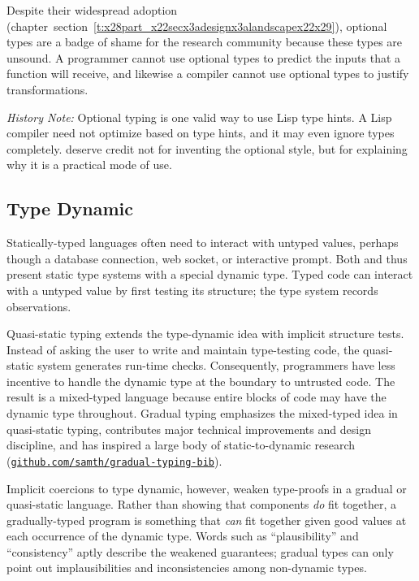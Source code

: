 \documentclass[ twoside,open=right,titlepage,numbers=noenddot,headinclude,%
                footinclude=true,cleardoublepage=empty,abstract=off,
                BCOR=5mm,paper=a4,fontsize=11pt,%
                ngerman,american,%
                parts,pdfspacing]{scrreprt}
\newcommand{\SecRef}[2]{section~#1}
\newcommand{\SecRefLocal}[3]{\hyperref[#1]{\SecRef{#2}{#3}}}
\newcommand{\Ssubsubsection}[2]{\subsubsection[#1]{#2}}
\newcommand{\Snolinkurl}[1]{\nolinkurl{#1}}
\renewcommand{\Ssubsubsection}[2]{\subsection[#1]{#2}}
\renewcommand{\SecRefLocal}[3]{section~\ref{#1}}
\begin{document}
Despite their widespread adoption (chapter~\SecRefLocal{t:x28part_x22secx3adesignx3alandscapex22x29}{4.2}{Assorted Behaviors by Example}),
 optional types are a badge of shame for the research community because
 these types are unsound.
A programmer cannot use optional types to predict the inputs that a function
 will receive, and likewise a compiler cannot use optional types to justify
 transformations.

\emph{History Note:}
Optional typing is one valid way to use Lisp type hints.
A Lisp compiler need not optimize based on type hints, and it may even ignore
 types completely.
 deserve credit not for inventing the optional style,
 but for explaining why it is a practical mode of use.

\Ssubsubsection{Type Dynamic}{Type Dynamic}\label{t:x28part_x22Typex5fDynamicx22x29}

Statically{-}typed languages often need to interact with untyped values,
 perhaps though a database connection, web socket, or interactive prompt.
Both  and  thus present static
 type systems with a special dynamic type.
Typed code can interact with a untyped value by first testing
 its structure; the type system records observations.

Quasi{-}static typing extends the type{-}dynamic idea with implicit structure
 tests.
Instead of asking the user to write and maintain type{-}testing code, the
 quasi{-}static system generates run{-}time checks.
Consequently, programmers have less incentive to handle the dynamic type
 at the boundary to untrusted code.
The result is a mixed{-}typed language because entire blocks of code may have
 the dynamic type throughout.
Gradual typing emphasizes the mixed{-}typed idea in quasi{-}static typing,
 contributes major technical improvements and design discipline,
 and has inspired a large body of static{-}to{-}dynamic research (\href{https://github.com/samth/gradual-typing-bib}{\Snolinkurl{github.com/samth/gradual-typing-bib}}).

Implicit coercions to type dynamic, however, weaken type{-}proofs in a
 gradual or quasi{-}static language.
Rather than showing that components \emph{do} fit together, a gradually{-}typed
 program is something that \emph{can} fit together given good values at each occurrence
 of the dynamic type.
Words such as {``}plausibility{''}
 and {``}consistency{''} aptly describe the weakened guarantees;
 gradual types can only point out implausibilities and inconsistencies among
 non{-}dynamic types.
\end{document}
